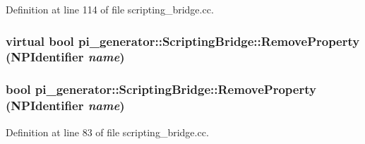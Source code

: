 Definition at line 114 of file scripting\_\-bridge.cc.

\hypertarget{classpi__generator_1_1_scripting_bridge_a5f317f9adabc7082079a919d1163cc09}{
\subsubsection[{RemoveProperty}]{\setlength{\rightskip}{0pt plus 5cm}virtual bool pi\_\-generator::ScriptingBridge::RemoveProperty (NPIdentifier {\em name})}}
\label{classpi__generator_1_1_scripting_bridge_a5f317f9adabc7082079a919d1163cc09}
\hypertarget{classpi__generator_1_1_scripting_bridge_ab1a46993e1a36b9857d48776f7085aa2}{
\subsubsection[{RemoveProperty}]{\setlength{\rightskip}{0pt plus 5cm}bool pi\_\-generator::ScriptingBridge::RemoveProperty (NPIdentifier {\em name})}}
\label{classpi__generator_1_1_scripting_bridge_ab1a46993e1a36b9857d48776f7085aa2}


Definition at line 83 of file scripting\_\-bridge.cc.


